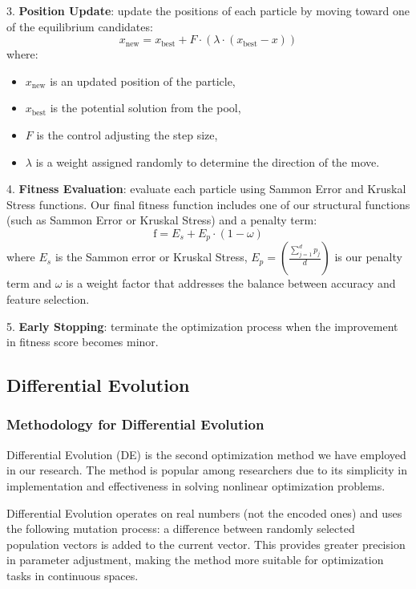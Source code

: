 \documentclass{styles/svproc}
\begin{document}
3. \textbf{Position Update}: update the positions of each particle by moving toward one of the equilibrium candidates:
   \[
   x_{\text{new}} = x_{\text{best}} + F \cdot \left( \lambda \cdot (x_{\text{best}} - x) \right)
   \]
   where:
   \begin{itemize}
       \item \( x_{\text{new}} \) is an updated position of the particle,
       \item \( x_{\text{best}} \) is the potential solution from the pool,
       \item \( F \) is the control adjusting the step size,
       \item \( \lambda \) is a weight assigned randomly to determine the direction of the move.
   \end{itemize}

4. \textbf{Fitness Evaluation}: evaluate each particle using Sammon Error and Kruskal Stress functions. Our final fitness function includes one of our structural functions (such as Sammon Error or Kruskal Stress) and a penalty term:
   \[
   \text{f} = E_s + E_p \cdot (1 - \omega)
   \]
   where \( E_s \) is the Sammon error or Kruskal Stress, $E_p = \left( \frac{\sum_{j=1}^d p_j}{d} \right)$ is our penalty term and \( \omega \) is a weight factor that addresses the balance between accuracy and feature selection.

5. \textbf{Early Stopping}: terminate the optimization process when the improvement in fitness score becomes minor.

\subsection{Differential Evolution}\label{Differential Evolution (DE)}

\subsubsection{Methodology for Differential Evolution}
Differential Evolution (DE) is the second optimization method we have employed in our research. The method is popular among researchers due to its simplicity in implementation and effectiveness in solving nonlinear optimization problems.

Differential Evolution operates on real numbers (not the encoded ones) and uses the following mutation process: a difference between randomly selected population vectors is added to the current vector. This provides greater precision in parameter adjustment, making the method more suitable for optimization tasks in continuous spaces.
\end{document}
